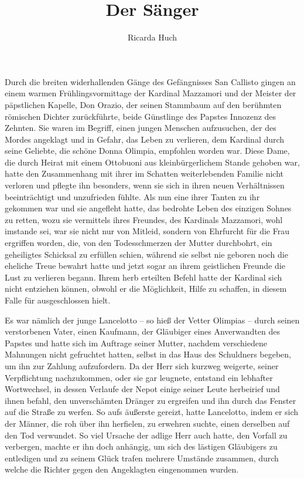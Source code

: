 \usepackage[german,ngerman]{babel}
\usepackage[T1]{fontenc}




\raggedbottom

\author{Ricarda Huch}
\title{Der Sänger}
\date{}
\lowertitleback{Diese Ausgabe basiert auf dem
  \href{http://www.gutenberg.net/}{Project Gutenberg}
  EBook \#27446.}

\maketitle

\pagenum{[55]}Durch die breiten widerhallenden Gänge des
Gefängnisses San Callisto gingen an einem warmen
Frühlingsvormittage der Kardinal Mazzamori und der Meister der
päpstlichen Kapelle, Don Orazio, der seinen Stammbaum auf den
berühmten römischen Dichter zurückführte, beide Günstlinge des
Papstes Innozenz des Zehnten. Sie waren im Begriff, einen jungen
Menschen aufzusuchen, der des Mordes angeklagt und in Gefahr, das
Leben zu verlieren, dem Kardinal durch seine Geliebte, die schöne
Donna Olimpia, empfohlen worden war. Diese Dame, die durch Heirat
mit einem Ottobuoni aus kleinbürgerlichem Stande gehoben war, hatte
den Zusammenhang mit ihrer im Schatten weiterlebenden Familie nicht
verloren und pflegte ihn besonders, wenn sie sich in ihren neuen
Verhältnissen beeinträchtigt und unzufrieden fühlte. Als nun eine
ihrer Tanten zu ihr gekommen war und sie angefleht hatte, das
bedrohte Leben des einzigen Sohnes zu retten, wozu sie vermittels
ihres Freundes, des Kardinals Mazzamori, wohl imstande sei, war sie
nicht nur von Mitleid, sondern von Ehrfurcht für die Frau ergriffen
worden, die, von den Todesschmerzen der Mutter durchbohrt, ein
geheiligtes Schicksal zu erfüllen schien, während sie selbst nie
geboren noch die eheliche Treue bewahrt hatte und jetzt sogar an
ihrem geistlichen Freunde die Lust zu verlieren begann. Ihrem herb
erteilten Befehl hatte der\pagenum{[56]} Kardinal sich nicht
entziehen können, obwohl er die Möglichkeit, Hilfe zu schaffen, in
diesem Falle für ausgeschlossen hielt.

Es war nämlich der junge Lancelotto – so hieß der Vetter Olimpias –
durch seinen verstorbenen Vater, einen Kaufmann, der Gläubiger
eines Anverwandten des Papstes und hatte sich im Auftrage seiner
Mutter, nachdem verschiedene Mahnungen nicht gefruchtet hatten,
selbst in das Haus des Schuldners begeben, um ihn zur Zahlung
aufzufordern. Da der Herr sich kurzweg weigerte, seiner
Verpflichtung nachzukommen, oder sie gar leugnete, entstand ein
lebhafter Wortwechsel, in dessen Verlaufe der Nepot einige seiner
Leute herbeirief und ihnen befahl, den unverschämten Dränger zu
ergreifen und ihn durch das Fenster auf die Straße zu werfen. So
aufs äußerste gereizt, hatte Lancelotto, indem er sich der Männer,
die roh über ihn herfielen, zu erwehren suchte, einen derselben auf
den Tod verwundet. So viel Ursache der adlige Herr auch hatte, den
Vorfall zu verbergen, machte er ihn doch anhängig, um sich des
lästigen Gläubigers zu entledigen und zu seinem Glück trafen
mehrere Umstände zusammen, durch welche die Richter gegen den
Angeklagten eingenommen wurden.

